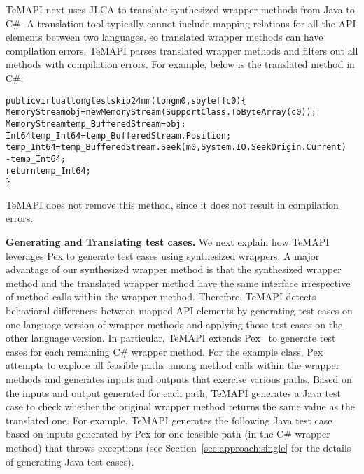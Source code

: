 TeMAPI next uses JLCA to translate synthesized wrapper methods from Java to C\#. A translation tool typically cannot include mapping relations for all the API elements between two languages, so translated wrapper methods can have compilation errors. TeMAPI parses translated wrapper methods and filters out all methods with compilation errors. For example, below is the translated  method in C\#:

\begin{CodeOut}%
\begin{alltt}
public virtual long testskip24nm(long m0, sbyte[] c0)\{
  MemoryStream obj = new MemoryStream(SupportClass.ToByteArray(c0));
  MemoryStream temp_BufferedStream = obj;
  Int64 temp_Int64 = temp_BufferedStream.Position;
  temp_Int64 = temp_BufferedStream.Seek(m0, System.IO.SeekOrigin.Current)
               - temp_Int64;
  return temp_Int64;
\}
\end{alltt}
\end{CodeOut}%

TeMAPI does not remove this method, since it does not result in compilation errors.

\textbf{Generating and Translating test cases.} We next explain how TeMAPI leverages Pex to generate test cases using synthesized wrappers. A major advantage of our synthesized wrapper method is that the synthesized wrapper method and the translated wrapper method have the same interface irrespective of method calls within the wrapper method. Therefore, TeMAPI detects behavioral differences between mapped API elements by generating test cases on one language version of wrapper methods and applying those test cases on the other language version. In particular, TeMAPI extends Pex~\cite{tillmann2008pex} to generate test cases for each remaining C\# wrapper method. For the example class, Pex attempts to explore all feasible paths among method calls within the wrapper methods and generates inputs and outputs that exercise various paths. Based on the inputs and output generated for each path, TeMAPI generates a Java test case to check whether the original wrapper method returns the same value as the translated one. For example, TeMAPI generates the following Java test case based on inputs generated by Pex for one feasible path (in the C\# wrapper method) that throws exceptions (see Section~\ref{sec:approach:single} for the details of generating Java test cases).

